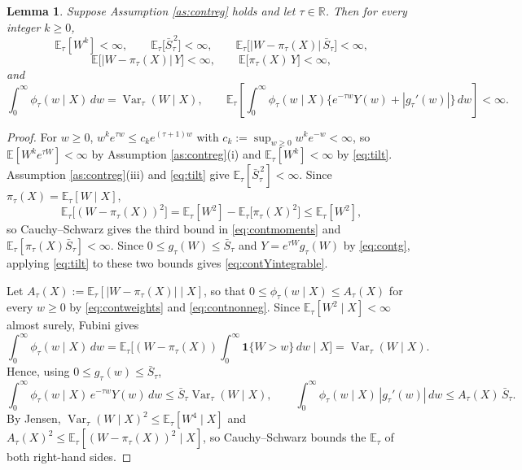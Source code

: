 \documentclass[11pt]{article}
\newtheorem{lemma}[theorem]{Lemma}
\theoremstyle{definition}
\theoremstyle{plain}
\newcommand{\E}{\mathbb{E}}
\newcommand{\1}{\mathbf{1}}
\newcommand{\R}{\mathbb{R}}
\begin{document}
\begin{lemma}
\label{lem:contmoments}
Suppose Assumption \ref{as:contreg} holds and let $\tau\in\R$.  Then for every integer $k\ge 0$,
\begin{equation}
\E_\tau[W^k]<\infty,
\qquad
\E_\tau\bigl[\bar S_\tau^{\,2}\bigr]<\infty,
\qquad
\E_\tau\bigl[|W-\pi_\tau(X)|\,\bar S_\tau\bigr]<\infty,
\label{eq:contmoments}
\end{equation}
\begin{equation}
\E\bigl[|W-\pi_\tau(X)|\,Y\bigr]<\infty,
\qquad
\E\bigl[\pi_\tau(X)\,Y\bigr]<\infty,
\label{eq:contYintegrable}
\end{equation}
and
\begin{equation}
\int_0^\infty \phi_\tau(w\mid X)\,dw=\operatorname{Var}_\tau(W\mid X),
\qquad
\E_\tau\left[\int_0^\infty \phi_\tau(w\mid X)\bigl\{e^{-\tau w}Y(w)+|g_\tau'(w)|\bigr\}\,dw\right]<\infty .
\label{eq:contweightmass}
\end{equation}
\end{lemma}

\begin{proof}
For $w\ge 0$, $w^ke^{\tau w}\le c_ke^{(\tau+1)w}$ with $c_k:=\sup_{w\ge 0}w^ke^{-w}<\infty$, so $\E[W^ke^{\tau W}]<\infty$ by Assumption \ref{as:contreg}(i) and $\E_\tau[W^k]<\infty$ by \eqref{eq:tilt}.  Assumption \ref{as:contreg}(iii) and \eqref{eq:tilt} give $\E_\tau[\bar S_\tau^{\,2}]<\infty$.  Since $\pi_\tau(X)=\E_\tau[W\mid X]$,
\[
\E_\tau\bigl[(W-\pi_\tau(X))^2\bigr]
=\E_\tau[W^2]-\E_\tau\bigl[\pi_\tau(X)^2\bigr]
\le\E_\tau[W^2],
\]
so Cauchy--Schwarz gives the third bound in \eqref{eq:contmoments} and $\E_\tau[\pi_\tau(X)\bar S_\tau]<\infty$.  Since $0\le g_\tau(W)\le\bar S_\tau$ and $Y=e^{\tau W}g_\tau(W)$ by \eqref{eq:contg}, applying \eqref{eq:tilt} to these two bounds gives \eqref{eq:contYintegrable}.

Let $A_\tau(X):=\E_\tau[|W-\pi_\tau(X)|\mid X]$, so that $0\le\phi_\tau(w\mid X)\le A_\tau(X)$ for every $w\ge 0$ by \eqref{eq:contweights} and \eqref{eq:contnonneg}.  Since $\E_\tau[W^2\mid X]<\infty$ almost surely, Fubini gives
\[
\int_0^\infty \phi_\tau(w\mid X)\,dw
=\E_\tau\Big[(W-\pi_\tau(X))\int_0^\infty\1\{W>w\}\,dw\;\Big|\;X\Big]
=\operatorname{Var}_\tau(W\mid X).
\]
Hence, using $0\le g_\tau(w)\le\bar S_\tau$,
\[
\int_0^\infty \phi_\tau(w\mid X)\,e^{-\tau w}Y(w)\,dw\le\bar S_\tau\operatorname{Var}_\tau(W\mid X),
\qquad
\int_0^\infty \phi_\tau(w\mid X)\,|g_\tau'(w)|\,dw\le A_\tau(X)\,\bar S_\tau .
\]
By Jensen, $\operatorname{Var}_\tau(W\mid X)^2\le\E_\tau[W^4\mid X]$ and $A_\tau(X)^2\le\E_\tau[(W-\pi_\tau(X))^2\mid X]$, so Cauchy--Schwarz bounds the $\E_\tau$ of both right-hand sides.
\end{proof}
\end{document}

